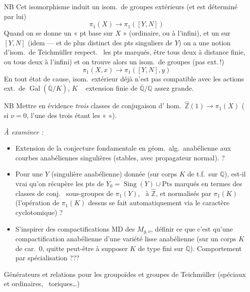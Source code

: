 \documentclass[11pt,a4paper]{article}
\begin{document}
NB Cet isomorphisme induit un isom.\ de groupes extérieurs \struck{\ill{}} (et est déterminé par lui)
\[
  \pi_1(X) \longrightarrow \pi_1([Y,N])
\]
Quand on se donne un « pt base sur $X$ » (ordinaire, ou à l'infini), et un sur $[Y,N]$ (idem --- et de plus distinct des pts singuliers de $Y$) on a une notion d'isom.\ de Teichmüller respect.\  les pts marqués, \struck{\ill{}}   être tous deux à distance finie, ou tous deux à l'infini) et on trouve alors un isom.\ de groupes (pas ext.\,!)
\[
  \pi_1(X,x) \longrightarrow \pi_1([Y,N],y)
\]
En tout état de cause,  isom.\ extérieur déjà n'est pas compatible avec les actions ext.\ de $\operatorname{Gal}(\overline{\mathbb{Q}}/K)$, $K$ \  extension finie de $\overline{\mathbb{Q}}/\mathbb{Q}$ assez grande.

NB Mettre en évidence \emph{trois} classes de conjugaison d'\struck{\ill{}} hom.\ $\hat{\mathbb{Z}}(1) \to \pi_1(X)$ ( si $\nu = 0$, l'une des trois étant les «  »).

\emph{À examiner :}
\begin{itemize}
  \item[a)] Extension de la conjecture fondamentale en géom.\ alg.\ anabélienne aux courbes anabéliennes  singulières (stables, avec propagateur normal). ?
  \item[b)] Pour une $Y$ (singulière anabélienne) donnée (sur corps $K$ de t.f.\ sur $\mathbb{Q}$),  est-il vrai qu'on récupère les pts de $Y_0 = \operatorname{Sing}(Y) \cup \mathrm{Pts}$ marqués en termes des classes de conj.\  sous-groupes de $\pi_1(Y)$, \ à $\hat{\mathbb{Z}}$, et  normalisés par $\pi_1(K)$ (l'opération de $\pi_1(K)$ dessus se fait automatiquement via le caractère cyclotomique) ?
  \item[c)] S'inspirer des compactifications MD des $M_{g,\nu}$, définir ce que c'est qu'une compactification anabélienne d'une variété lisse anabélienne (sur un corps $K$ de car.~$0$, quitte peut-être à supposer $K$ de type fini sur $\mathbb{Q}$). Comportement par spécialisation ???
\end{itemize}

Générateurs et relations pour les groupoïdes et groupes de Teichmüller (spéciaux et ordinaires, \ toriques…)
\end{document}
